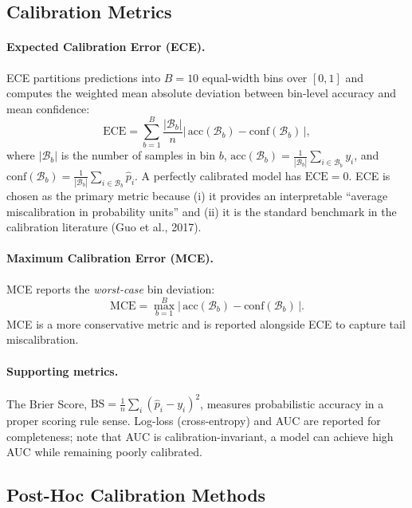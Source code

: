 \documentclass[12pt]{article}
\begin{document}
\subsection{Calibration Metrics}

\paragraph{Expected Calibration Error (ECE).}
ECE partitions predictions into $B = 10$ equal-width bins over $[0, 1]$ and
computes the weighted mean absolute deviation between bin-level accuracy and
mean confidence:
\begin{equation}
  \text{ECE} = \sum_{b=1}^{B} \frac{|\mathcal{B}_b|}{n}
    \left|\,\text{acc}(\mathcal{B}_b) - \text{conf}(\mathcal{B}_b)\,\right|,
  \label{eq:ece}
\end{equation}
where $|\mathcal{B}_b|$ is the number of samples in bin $b$,
$\text{acc}(\mathcal{B}_b) = \frac{1}{|\mathcal{B}_b|}\sum_{i\in\mathcal{B}_b}y_i$,
and $\text{conf}(\mathcal{B}_b) = \frac{1}{|\mathcal{B}_b|}\sum_{i\in\mathcal{B}_b}\hat{p}_i$.
A perfectly calibrated model has $\text{ECE} = 0$.
ECE is chosen as the primary metric because (i) it provides an interpretable
``average miscalibration in probability units'' and (ii) it is the standard
benchmark in the calibration literature (Guo et al., 2017).

\paragraph{Maximum Calibration Error (MCE).}
MCE reports the \emph{worst-case} bin deviation:
\begin{equation}
  \text{MCE} = \max_{b=1}^{B}
    \left|\,\text{acc}(\mathcal{B}_b) - \text{conf}(\mathcal{B}_b)\,\right|.
  \label{eq:mce}
\end{equation}
MCE is a more conservative metric and is reported alongside ECE to capture
tail miscalibration.

\paragraph{Supporting metrics.}
The Brier Score,
$\text{BS} = \frac{1}{n}\sum_i (\hat{p}_i - y_i)^2$,
measures probabilistic accuracy in a proper scoring rule sense.
Log-loss (cross-entropy) and AUC are reported for completeness; note that
AUC is calibration-invariant, a model can achieve high AUC while remaining
poorly calibrated.

\subsection{Post-Hoc Calibration Methods}
\label{sec:calib-methods}
\end{document}
